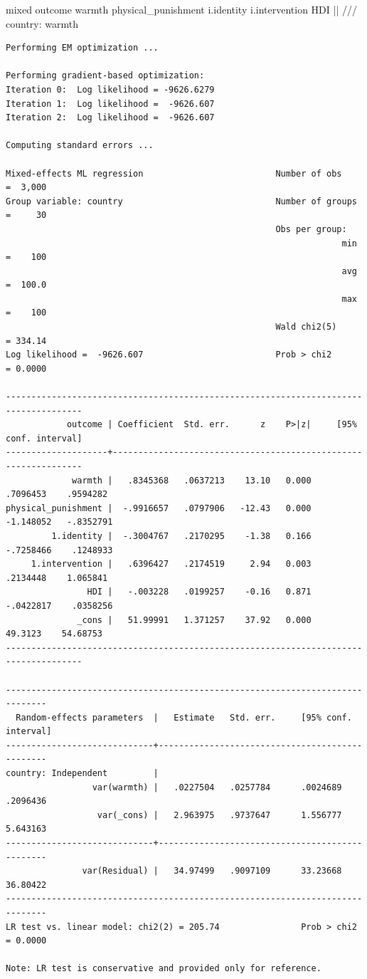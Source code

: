 \documentclass[
  letterpaper,
  DIV=11,
  numbers=noendperiod]{scrreprt}
\newenvironment{Shaded}{\begin{snugshade}}{\end{snugshade}}
\newcommand{\CommentTok}[1]{\textcolor[rgb]{0.37,0.37,0.37}{#1}}
\newcommand{\KeywordTok}[1]{\textcolor[rgb]{0.00,0.23,0.31}{#1}}
\newcommand{\NormalTok}[1]{\textcolor[rgb]{0.00,0.23,0.31}{#1}}
\begin{document}
\begin{Shaded}
\begin{Highlighting}[]
\NormalTok{mixed outcome warmth physical\_punishment i.}\KeywordTok{identity}\NormalTok{ i.intervention HDI || }\CommentTok{/// }
\NormalTok{country: warmth}
\end{Highlighting}
\end{Shaded}

\begin{verbatim}
Performing EM optimization ...

Performing gradient-based optimization: 
Iteration 0:  Log likelihood = -9626.6279  
Iteration 1:  Log likelihood =  -9626.607  
Iteration 2:  Log likelihood =  -9626.607  

Computing standard errors ...

Mixed-effects ML regression                          Number of obs    =  3,000
Group variable: country                              Number of groups =     30
                                                     Obs per group:
                                                                  min =    100
                                                                  avg =  100.0
                                                                  max =    100
                                                     Wald chi2(5)     = 334.14
Log likelihood =  -9626.607                          Prob > chi2      = 0.0000

-------------------------------------------------------------------------------------
            outcome | Coefficient  Std. err.      z    P>|z|     [95% conf. interval]
--------------------+----------------------------------------------------------------
             warmth |   .8345368   .0637213    13.10   0.000     .7096453    .9594282
physical_punishment |  -.9916657   .0797906   -12.43   0.000    -1.148052   -.8352791
         1.identity |  -.3004767   .2170295    -1.38   0.166    -.7258466    .1248933
     1.intervention |   .6396427   .2174519     2.94   0.003     .2134448    1.065841
                HDI |   -.003228   .0199257    -0.16   0.871    -.0422817    .0358256
              _cons |   51.99991   1.371257    37.92   0.000      49.3123    54.68753
-------------------------------------------------------------------------------------

------------------------------------------------------------------------------
  Random-effects parameters  |   Estimate   Std. err.     [95% conf. interval]
-----------------------------+------------------------------------------------
country: Independent         |
                 var(warmth) |   .0227504   .0257784      .0024689    .2096436
                  var(_cons) |   2.963975   .9737647      1.556777    5.643163
-----------------------------+------------------------------------------------
               var(Residual) |   34.97499   .9097109      33.23668    36.80422
------------------------------------------------------------------------------
LR test vs. linear model: chi2(2) = 205.74                Prob > chi2 = 0.0000

Note: LR test is conservative and provided only for reference.
\end{verbatim}
\end{document}

